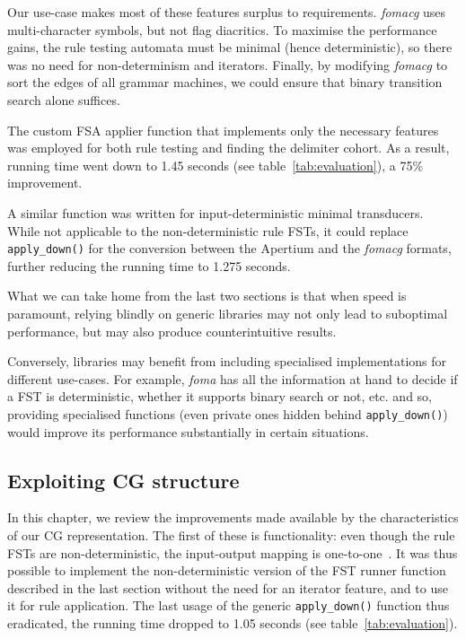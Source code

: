 \documentclass[11pt]{article}
\begin{document}
Our use-case makes most of these features surplus to requirements. \emph{fomacg} uses
multi-character symbols, but not flag diacritics. To maximise the performance
gains, the rule testing automata must be minimal (hence deterministic), so
there was no need for non-determinism and iterators. Finally, by modifying
\emph{fomacg} to sort the edges of all grammar machines, we could ensure that
binary transition search alone suffices.

The custom FSA applier function that implements only the necessary features
was employed for both rule testing and finding the delimiter cohort. As a result,
running time went down to 1.45 seconds (see table~\ref{tab:evaluation}), a 75\%
improvement.

A similar function was written for input-deterministic minimal transducers.
While not applicable to the non-deterministic rule FSTs, it could
replace \texttt{apply\_down()} for the conversion between the Apertium and  %
the \emph{fomacg} formats, further reducing the running time to 1.275 seconds.


What we can take home from the last two sections is that when speed is paramount,
relying blindly on generic libraries may not only lead to suboptimal performance,
but may also produce counterintuitive results.

Conversely, libraries may benefit from including specialised implementations
for different use-cases. For example, \emph{foma} has all the information at hand
to decide if a FST is deterministic, whether it supports binary search or not,
etc. and so, providing specialised functions (even private ones hidden behind
\texttt{apply\_down()}) would improve its performance substantially in certain
situations.

\subsection{Exploiting CG structure}  %
\label{sec:speed_cg}

In this chapter, we review the improvements made available by the
characteristics of our CG representation. The first of these is functionality:
even though the rule FSTs are non-deterministic, the input-output mapping is
one-to-one~\cite{Hulden:2011}. It was thus possible to implement the
non-deterministic version of the FST runner function described in the last
section without the need for an iterator feature, and to use it for rule
application. The last usage of the generic \texttt{apply\_down()} function  %
thus eradicated, the running time dropped to 1.05 seconds (see
table~\ref{tab:evaluation}).
\end{document}
